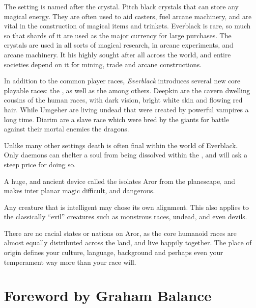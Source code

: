 \begin{enumerate}
  The setting is named after the 
 crystal. Pitch black crystals that can store any magical energy. They are
 often used to aid casters, fuel arcane machinery, and are vital in the
 construction of magical items and trinkets. Everblack is rare, so much so
 that shards of it are used as the major currency for large purchases. The
 crystals are used in all sorts of magical research, in arcane experiments,
 and arcane machinery. It his highly sought after all across the world, and
 entire societies depend on it for mining, trade and arcane constructions.

  In addition to the common player races, \emph{Everblack}
 introduces several new core playable races: the ,
  as well as the  among
 others. Deepkin are the cavern dwelling cousins of the human races, with dark
 vision, bright white skin and flowing red hair. While Umgeher are living
 undead that were created by powerful vampires a long time. Diarim are a slave
 race which were bred by the giants for battle against their mortal enemies
 the dragons.

  Unlike many other settings death is often final
 within the world of Everblack. Only daemons can shelter a soul from being
 dissolved within the , and will ask a steep price for
 doing so.

  A huge, and ancient device called the
  isolates Aror from the planescape, and makes inter
 planar magic difficult, and dangerous.

  Any creature that is intelligent may chose
 its own alignment. This also applies to the classically ``evil'' creatures
 such as monstrous races, undead, and even devils.

  There are no racial states or nations on Aror, as
 the core humanoid races are almost equally distributed across the land, and
 live happily together. The place of origin defines your culture, language,
 background and perhaps even your temperament way more than your race will.

\end{enumerate}

\pagebreak

\onecolumn
\section{Foreword by Graham Balance}

